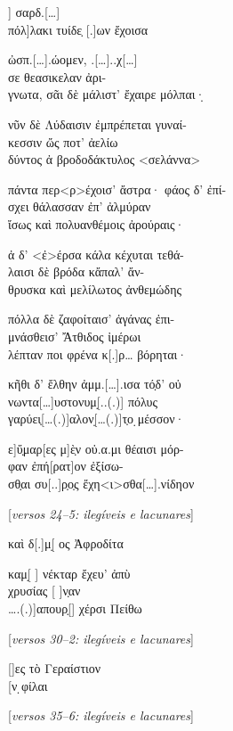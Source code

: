 \begin{gkverse}
] σαρδ.[\ldots{}]\\
     πόλ]λακι τυίδε̣ [.]ων ἔχοισα

ὠσπ.[\ldots{}].ώομεν, .[\ldots{}]..χ[\ldots{}]\\
    σε \dagger{}θεασικελαν ἀρι-\\
      γνωτα\dagger{}, σᾶι δὲ μάλιστ’ ἔχαιρε μόλπαι·̣

νῦν δὲ Λύδαισιν ἐμπρέπεται γυναί-\\
    κεσσιν ὤς ποτ’ ἀελίω\\
      δύντος ἀ βροδοδάκτυλος <σελάννα>

πάντα περ<ρ>έχοισ’ ἄστρα· φάος δ’ ἐπί-\\
    σχει θάλασσαν ἐπ’ ἀλμύραν\\
      ἴσως καὶ πολυανθέμοις ἀρούραις·

ἀ δ’ <ἐ>έρσα κάλα κέχυται τεθά-\\
    λαισι δὲ βρόδα κἄπαλ’ ἄν-\\
      θρυσκα καὶ μελίλωτος ἀνθεμώδης 

πόλλα δὲ ζαφοίταισ’ ἀγάνας ἐπι-\\
    μνάσθεισ’ Ἄτθιδος ἰμέρωι\\
      λέπταν ποι φρένα κ[.]ρ\ldots{} βόρηται·

κῆθι δ’ ἔλθην ἀμμ.[\ldots{}].ισα τό̣δ’ οὐ\\
    νωντα[\ldots{}]υστονυμ[̣..(.)] πόλυς\\
      γαρύει̣[\ldots{}(.)]αλον[̣\ldots{}(.)]τ̣ο ̣μέσσον·

ε]ὔ̣μαρ[ες μ]ὲ̣ν οὐ.α.μι θέαισι μόρ-\\
    φαν ἐπή[ρατ]ον ἐξίσω-\\
      σθ̣αι συ[..]ρ̣ο̣ς ἔχη<ι>σθα[\ldots{}].νίδηον

\textnormal{[\textit{versos 24--5: ilegíveis e lacunares}]}

      καὶ δ[.]μ{[}̣	\qquad		{]}ος Ἀφροδίτα

καμ[̣		\qquad	] νέκταρ ἔχευ’ ἀπὺ\\
    χρυσίας [		       ]ν̣αν\\
      \ldots{}.(.)]απουρ̣[\qquad		] χέρσι Πείθω

\textnormal{[\textit{versos 30--2: ilegíveis e lacunares}]}

[\qquad			]ες τὸ Γεραίστιον\\
    {[}\qquad			   {]}ν ̣φίλαι

\textnormal{[\textit{versos 35--6: ilegíveis e lacunares}]}
\end{gkverse}


